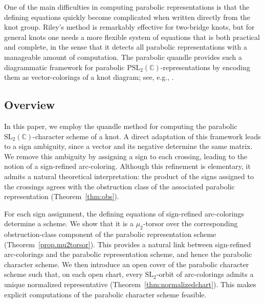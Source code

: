 \documentclass[12pt,reqno]{amsart}
\newcommand{\BC}{\mathbb{C}}
\newcommand{\SL}{\mathrm{SL}}
\theoremstyle{definition}
\begin{document}
	One of the main difficulties in computing parabolic representations is that the defining equations quickly become complicated when written directly from the knot group. Riley's method is remarkably effective for two-bridge knots, but for general knots one needs a more flexible system of equations that is both practical and complete, in the sense that it detects all parabolic representations with a manageable amount of computation. The parabolic quandle provides such a diagrammatic framework for parabolic $\mathrm{PSL}_2(\BC)$-representations by encoding them as vector-colorings of a knot diagram; see, e.g., \cite{inoue_quandle_2013, cho_quandle_2018,JoKim}. 
	
	\subsection{Overview}
    In this paper, we employ the quandle method for computing the parabolic $\mathrm{SL}_2(\BC)$-character scheme of a knot. A direct adaptation of this framework leads to a sign ambiguity, since a vector and its negative determine the same matrix. We remove this ambiguity by assigning a sign to each crossing, leading to the notion of a sign-refined arc-coloring. Although this refinement is elementary, it admits a natural theoretical interpretation: the product of the signs assigned to the crossings agrees with the obstruction class of the associated parabolic representation (Theorem~\ref{thm:obs}).

    For each sign assignment, the defining equations of sign-refined arc-colorings determine a scheme. We show that it is a $\mu_2$-torsor over the corresponding obstruction-class component of the parabolic representation scheme (Theorem~\ref{prop.mu2torsor}). This provides a natural link between sign-refined arc-colorings and the parabolic representation scheme, and hence the parabolic character scheme. We then introduce an open cover of the parabolic character scheme such that, on each open chart, every $\SL_2$-orbit of arc-colorings admits a unique normalized representative (Theorem~\ref{thm:normalizedchart}). This makes explicit computations of the parabolic character scheme feasible.
	
\end{document}
